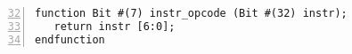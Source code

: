 {\small
\begin{Verbatim}[frame=single, numbers=left, firstnumber=32, label=src\_Common/Instr\_Bits.bsv]
function Bit #(7) instr_opcode (Bit #(32) instr);
   return instr [6:0];
endfunction
\end{Verbatim}
}
